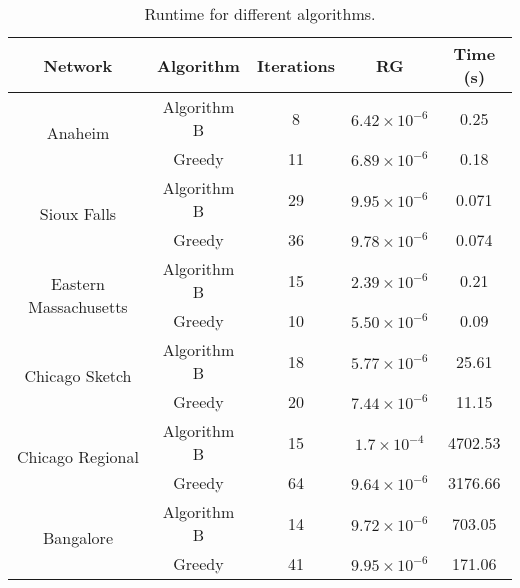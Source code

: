 \begin{table}
\caption{Runtime for different algorithms.}
\label{table:resulttable-cpp}
\center
\begin{tabular}{|c|c|c|c|c|}
\hline
Network	&	Algorithm	&	Iterations	&	RG	& Time (s)\\
\hline
\multirow{2}{*}{Anaheim}
	&	Algorithm B	&	8	&	$6.42\times 10^{-6}$	&	0.25\\
	&	Greedy	&	11	&	$6.89\times 10^{-6}$	&	0.18\\
	\hline
\multirow{2}{*}{Sioux Falls}
	&	Algorithm B		&	29	&	$9.95\times 10^{-6}$	&	0.071\\
	&	Greedy	&	36		&	$9.78\times 10^{-6}$	&	0.074\\
\hline
\multirow{2}{*}{Eastern Massachusetts}
	&	Algorithm B		&	15	&	$2.39\times 10^{-6}$	&	0.21\\
	&	Greedy	&	10		&	$5.50\times 10^{-6}$	&	0.09\\
	\hline
\multirow{2}{*}{Chicago Sketch}
	&	Algorithm B	&	18	&	$5.77\times 10^{-6}$	&	25.61\\
	&	Greedy  &	20	&	$7.44\times 10^{-6}$	&	11.15\\
	\hline
\multirow{2}{*}{Chicago Regional}
	& Algorithm B	&	15	&	$1.7\times 10^{-4}$	&	4702.53\\
	& Greedy	&	64	&	$9.64\times 10^{-6}$	&	3176.66\\
\hline
\multirow{2}{*}{Bangalore}
	&	Algorithm B	& 14	&	$9.72\times 10^{-6}$	&	703.05\\
	&	Greedy	&	41	&	$9.95\times 10^{-6}$	&	171.06\\
\hline
\end{tabular}
\end{table}
